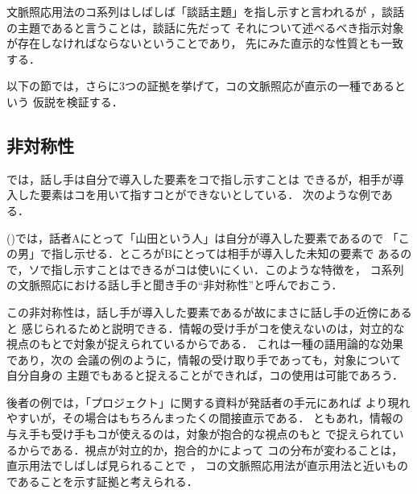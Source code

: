 
文脈照応用法のコ系列はしばしば「談話主題」を指し示すと言われるが
\cite{syooho81,iori95a}，談話の主題であると言うことは，談話に先だって
それについて述べるべき指示対象が存在しなければならないということであり，
先にみた直示的な性質とも一致する．

以下の節では，さらに3つの証拠を挙げて，コの文脈照応が直示の一種であるという
仮説を検証する．

\subsection{非対称性}
\cite{kuno73b}では，話し手は自分で導入した要素をコで指し示すことは
できるが，相手が導入した要素はコを用いて指すコとができないとしている．
次のような例である．


()では，話者Aにとって「山田という人」は自分が導入した要素であるので
「この男」で指し示せる．ところがBにとっては相手が導入した未知の要素で
あるので，ソで指し示すことはできるがコは使いにくい．このような特徴を，
コ系列の文脈照応における話し手と聞き手の``非対称性''と呼んでおこう．

この非対称性は，話し手が導入した要素であるが故にまさに話し手の近傍にあると
感じられるためと説明できる．情報の受け手がコを使えないのは，対立的な
視点のもとで対象が捉えられているからである．
これは一種の語用論的な効果であり，次の
会議の例のように，情報の受け取り手であっても，対象について自分自身の
主題でもあると捉えることができれば，コの使用は可能であろう．


後者の例では，「プロジェクト」に関する資料が発話者の手元にあれば
より現れやすいが，その場合はもちろんまったくの間接直示である．
ともあれ，情報の与え手も受け手もコが使えるのは，対象が抱合的な視点のもと
で捉えられているからである．視点が対立的か，抱合的かによって
コの分布が変わることは，直示用法でしばしば見られることで
\cite{mikami55,ktninti}，
コの文脈照応用法が直示用法と近いものであることを示す証拠と考えられる．


